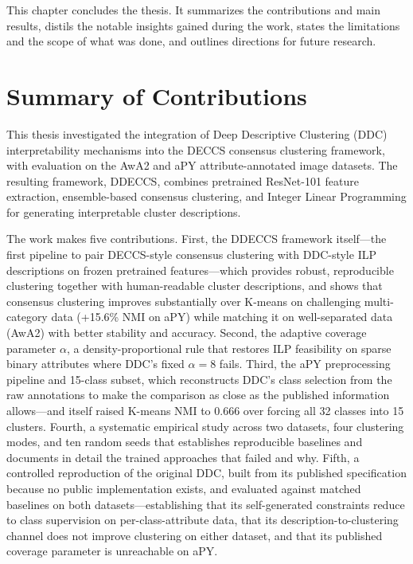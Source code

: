 \label{chap:conclusion}

This chapter concludes the thesis. It summarizes the contributions and main results, distils the notable insights gained during the work, states the limitations and the scope of what was done, and outlines directions for future research.

\section{Summary of Contributions}

This thesis investigated the integration of Deep Descriptive Clustering (DDC) interpretability mechanisms into the DECCS consensus clustering framework, with evaluation on the AwA2 and aPY attribute-annotated image datasets. The resulting framework, DDECCS, combines pretrained ResNet-101 feature extraction, ensemble-based consensus clustering, and Integer Linear Programming for generating interpretable cluster descriptions.

The work makes five contributions. First, the DDECCS framework itself---the first pipeline to pair DECCS-style consensus clustering with DDC-style ILP descriptions on frozen pretrained features---which provides robust, reproducible clustering together with human-readable cluster descriptions, and shows that consensus clustering improves substantially over K-means on challenging multi-category data (+15.6\% NMI on aPY) while matching it on well-separated data (AwA2) with better stability and accuracy. Second, the adaptive coverage parameter $\alpha$, a density-proportional rule that restores ILP feasibility on sparse binary attributes where DDC's fixed $\alpha = 8$ fails. Third, the aPY preprocessing pipeline and 15-class subset, which reconstructs DDC's class selection from the raw annotations to make the comparison as close as the published information allows---and itself raised K-means NMI to 0.666 over forcing all 32 classes into 15 clusters. Fourth, a systematic empirical study across two datasets, four clustering modes, and ten random seeds that establishes reproducible baselines and documents in detail the trained approaches that failed and why. Fifth, a controlled reproduction of the original DDC, built from its published specification because no public implementation exists, and evaluated against matched baselines on both datasets---establishing that its self-generated constraints reduce to class supervision on per-class-attribute data, that its description-to-clustering channel does not improve clustering on either dataset, and that its published coverage parameter is unreachable on aPY.

